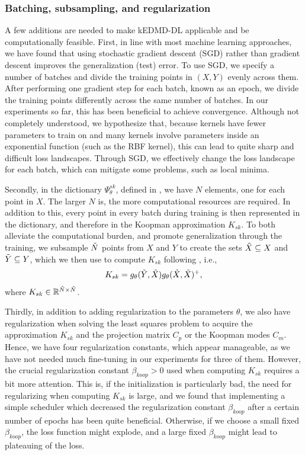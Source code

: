 \documentclass{article}
\begin{document}
\subsubsection{Batching, subsampling, and regularization}
A few additions are needed to make kEDMD-DL applicable and be computationally feasible. First, in line with most machine learning approaches, we have found that using stochastic gradient descent (SGD) rather than gradient descent improves the generalization (test) error. To use SGD, we specify a number of batches and divide the training points in \((X, Y)\) evenly across them. After performing one gradient step for each batch, known as an epoch, we divide the training points differently across the same number of batches. In our experiments so far, this has been beneficial to achieve convergence. Although not completely understood, we hypothesize that, because kernels have fewer parameters to train on and many kernels involve parameters inside an exponential function (such as the RBF kernel), this can lead to quite sharp and difficult loss landscapes. Through SGD, we effectively change the loss landscape for each batch, which can mitigate some problems, such as local minima.

Secondly, in the dictionary \(\Psi^{sk}_{\theta}\), defined in , we have \(N\) elements, one for each point in \(X\). The larger \(N\) is, the more computational resources are required. In addition to this, every point in every batch during training is then represented in the dictionary, and therefore in the Koopman approximation \(K_{sk}\). To both alleviate the computational burden, and promote generalization through the training, we subsample \(\Tilde N\) points from \(X\) and \(Y\) to create the sets \(\Tilde X \subseteq X\) and \(\Tilde Y \subseteq Y\), which we then use to compute \(K_{sk}\) following , i.e., 
\begin{align*}
    K_{sk} = g_{\theta}(\Tilde Y, \Tilde X) g_{\theta}(\Tilde X, \Tilde X)^+,
\end{align*}
where \(K_{sk} \in \mathbb{R}^{\Tilde N \times \Tilde N}\).

Thirdly, in addition to adding regularization to the parameters \(\theta\), we also have regularization when solving the least squares problem to acquire the approximation \(K_{sk}\) and the projection matrix \(C_p\) or the Koopman modes \(C_m\). Hence, we have four regularization constants, which appear manageable, as we have not needed much fine-tuning in our experiments for three of them. However, the crucial regularization constant \(\beta_{koop}>0\) used when computing \(K_{sk}\) requires a bit more attention. This is, if the initialization is particularly bad, the need for regularizing when computing \(K_{sk}\) is large, and we found that implementing a simple scheduler which decreased the regularization constant \(\beta_{koop}\) after a certain number of epochs has been quite beneficial. Otherwise, if we choose a small fixed \(\beta_{koop}\), the loss function might explode, and a large fixed \(\beta_{koop}\) might lead to plateauing of the loss.
\end{document}
